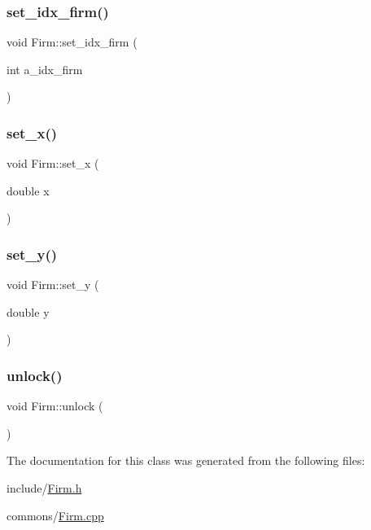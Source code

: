 \mbox{\label{class_firm_a7843435f938d27998bbac944d8063927}} 
\subsubsection{\texorpdfstring{set\_idx\_firm()}{set\_idx\_firm()}}
{\footnotesize\ttfamily void Firm\+::set\+\_\+idx\+\_\+firm (\begin{DoxyParamCaption}\item[{int}]{a\+\_\+idx\+\_\+firm }\end{DoxyParamCaption})}

\mbox{\label{class_firm_aa8244e54ed25b6518401b4bf7c3c96ca}} 
\subsubsection{\texorpdfstring{set\_x()}{set\_x()}}
{\footnotesize\ttfamily void Firm\+::set\+\_\+x (\begin{DoxyParamCaption}\item[{double}]{x }\end{DoxyParamCaption})}

\mbox{\label{class_firm_af1b38a4dad355a4e88deaff00f61e0b3}} 
\subsubsection{\texorpdfstring{set\_y()}{set\_y()}}
{\footnotesize\ttfamily void Firm\+::set\+\_\+y (\begin{DoxyParamCaption}\item[{double}]{y }\end{DoxyParamCaption})}

\mbox{\label{class_firm_a2a2db6e2bf58608ce874af2472050e9f}} 
\subsubsection{\texorpdfstring{unlock()}{unlock()}}
{\footnotesize\ttfamily void Firm\+::unlock (\begin{DoxyParamCaption}{ }\end{DoxyParamCaption})\hspace{0.3cm}{\ttfamily [inline]}}



The documentation for this class was generated from the following files\+:\begin{DoxyCompactItemize}
\item 
include/\mbox{\hyperlink{_firm_8h}{Firm.\+h}}\item 
commons/\mbox{\hyperlink{commons_2_firm_8cpp}{Firm.\+cpp}}\end{DoxyCompactItemize}
